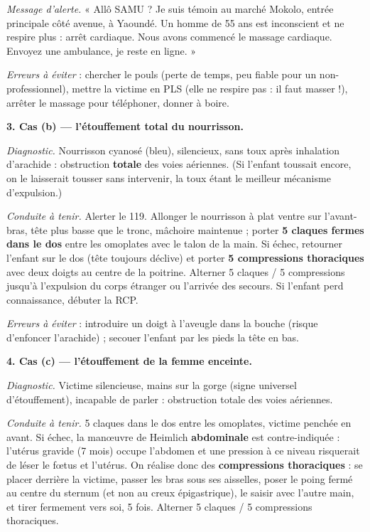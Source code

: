 \documentclass[11pt]{article}
\begin{document}
\begin{exoresolu}
\emph{Message d'alerte.} « Allô SAMU ? Je suis témoin au marché Mokolo, entrée principale côté avenue, à Yaoundé. Un homme de 55 ans est inconscient et ne respire plus : arrêt cardiaque. Nous avons commencé le massage cardiaque. Envoyez une ambulance, je reste en ligne. »

\emph{Erreurs à éviter} : chercher le pouls (perte de temps, peu fiable pour un non-professionnel), mettre la victime en PLS (elle ne respire pas : il faut masser !), arrêter le massage pour téléphoner, donner à boire.

\textbf{3. Cas (b) — l'étouffement total du nourrisson.}

\emph{Diagnostic.} Nourrisson cyanosé (bleu), silencieux, sans toux après inhalation d'arachide : obstruction \textbf{totale} des voies aériennes. (Si l'enfant toussait encore, on le laisserait tousser sans intervenir, la toux étant le meilleur mécanisme d'expulsion.)

\emph{Conduite à tenir.} Alerter le 119. Allonger le nourrisson à plat ventre sur l'avant-bras, tête plus basse que le tronc, mâchoire maintenue ; porter \textbf{5 claques fermes dans le dos} entre les omoplates avec le talon de la main. Si échec, retourner l'enfant sur le dos (tête toujours déclive) et porter \textbf{5 compressions thoraciques} avec deux doigts au centre de la poitrine. Alterner 5 claques / 5 compressions jusqu'à l'expulsion du corps étranger ou l'arrivée des secours. Si l'enfant perd connaissance, débuter la RCP.

\emph{Erreurs à éviter} : introduire un doigt à l'aveugle dans la bouche (risque d'enfoncer l'arachide) ; secouer l'enfant par les pieds la tête en bas.

\textbf{4. Cas (c) — l'étouffement de la femme enceinte.}

\emph{Diagnostic.} Victime silencieuse, mains sur la gorge (signe universel d'étouffement), incapable de parler : obstruction totale des voies aériennes.

\emph{Conduite à tenir.} 5 claques dans le dos entre les omoplates, victime penchée en avant. Si échec, la manœuvre de Heimlich \textbf{abdominale} est contre-indiquée : l'utérus gravide (7 mois) occupe l'abdomen et une pression à ce niveau risquerait de léser le fœtus et l'utérus. On réalise donc des \textbf{compressions thoraciques} : se placer derrière la victime, passer les bras sous ses aisselles, poser le poing fermé au centre du sternum (et non au creux épigastrique), le saisir avec l'autre main, et tirer fermement vers soi, 5 fois. Alterner 5 claques / 5 compressions thoraciques.


\end{exoresolu}
\end{document}

